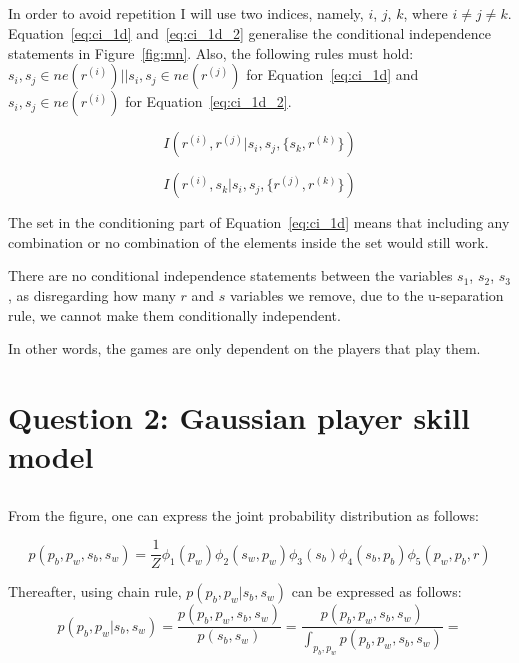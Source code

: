 \documentclass[a4paper,11pt]{article}
\theoremstyle{mytheor}
\begin{document}
\subsection{}
\label{sec:1d}

In order to avoid repetition I will use two indices, namely, $i$, $j$, $k$, where $i \neq j \neq k$. Equation~\ref{eq:ci_1d} and~\ref{eq:ci_1d_2} generalise the conditional independence statements in Figure~\ref{fig:mn}. Also, the following rules must hold: $s_i, s_j \in ne(r^{(i)}) || s_i, s_j \in ne(r^{(j)})$ for Equation~\ref{eq:ci_1d} and $s_i, s_j \in ne(r^{(i)})$ for Equation~\ref{eq:ci_1d_2}.

\begin{equation}
    \label{eq:ci_1d}
    I(r^{(i)}, r^{(j)} |s_i,s_j,\{s_k, r^{(k)}\})
\end{equation}

\begin{equation}
    \label{eq:ci_1d_2}
    I(r^{(i)}, s_k | s_i,s_j,\{r^{(j)}, r^{(k)}\})
\end{equation}

The set in the conditioning part of Equation~\ref{eq:ci_1d} means that including any combination or no combination of the elements inside the set would still work.

There are no conditional independence statements between the variables $s_1$, $s_2$, $s_3$, as disregarding how many $r$ and $s$ variables we remove, due to the u-separation rule, we cannot make them conditionally independent.

In other words, the games are only dependent on the players that play them.

\section{Question 2: Gaussian player skill model}
\label{sec:2}
\subsection{}
From the figure, one can express the joint probability distribution as follows:

\begin{equation}
    \label{eq:joint_distr}
    p(p_b,p_w,s_b,s_w) = \frac{1}{Z}\phi_{1}(p_w)\phi_{2}(s_w,p_w)\phi_{3}(s_b)\phi_{4}(s_b,p_b)\phi_{5}(p_w,p_b,r)
\end{equation}

Thereafter, using chain rule, $p(p_b,p_w|s_b,s_w)$ can be expressed as follows:
\begin{equation}
    \label{eq:chain_rule}
    p(p_b,p_w|s_b,s_w) = \frac{p(p_b,p_w,s_b,s_w)}{p(s_b,s_w)} = \frac{p(p_b,p_w,s_b,s_w)}{\int_{p_b,p_w} p(p_b,p_w,s_b,s_w)}= 
\end{equation}
\end{document}
